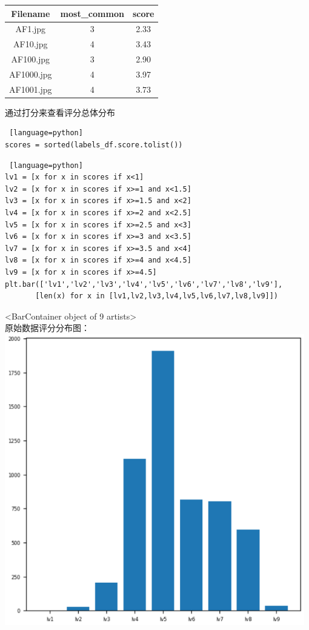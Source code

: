 \documentclass{article}
\begin{document}
\begin{tabular}{ccc}%
\toprule %
Filename& most\_common& score\\
\midrule %
AF1.jpg& 3& 2.33\\
AF10.jpg& 4& 3.43\\
AF100.jpg& 3&2.90\\
AF1000.jpg& 4& 3.97\\
AF1001.jpg& 4&3.73\\
\bottomrule %
\end{tabular}

通过打分来查看评分总体分布
\begin{lstlisting} [language=python]
scores = sorted(labels_df.score.tolist())
\end{lstlisting}
\begin{lstlisting} [language=python]
lv1 = [x for x in scores if x<1]
lv2 = [x for x in scores if x>=1 and x<1.5]
lv3 = [x for x in scores if x>=1.5 and x<2]
lv4 = [x for x in scores if x>=2 and x<2.5]
lv5 = [x for x in scores if x>=2.5 and x<3]
lv6 = [x for x in scores if x>=3 and x<3.5]
lv7 = [x for x in scores if x>=3.5 and x<4]
lv8 = [x for x in scores if x>=4 and x<4.5]
lv9 = [x for x in scores if x>=4.5]
plt.bar(['lv1','lv2','lv3','lv4','lv5','lv6','lv7','lv8','lv9'],
       [len(x) for x in [lv1,lv2,lv3,lv4,lv5,lv6,lv7,lv8,lv9]])
\end{lstlisting}
<BarContainer object of 9 artists>\\

原始数据评分分布图：\\
\includegraphics[width=0.98\textwidth]{1.png}
\end{document}
